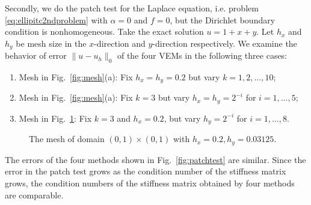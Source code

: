 \documentclass[10pt]{amsart}
\numberwithin{equation}{section}
\begin{document}
Secondly, we do the patch test for the Laplace equation, i.e. problem \eqref{eq:ellipitc2ndproblem} with $\alpha = 0$ and $f=0$, but the Dirichlet boundary condition is nonhomogeneous. Take the exact solution $u=1+x+y$. %
Let $h_x$ and $h_y$ be mesh size in the $x$-direction and
$y$-direction respectively.
We examine the behavior of error $\|u - u_h\|_0$ of the four VEMs in the
following three cases:
\begin{enumerate}[(1)]
\item Mesh in Fig.~\ref{fig:mesh}(a): Fix $h_x=h_y=0.2$ but vary $k= 1, 2, \ldots, 10$;
\item Mesh in Fig.~\ref{fig:mesh}(a): Fix $k=3$ but vary $h_x=h_y=2^{-i}$ for $i=1,\ldots, 5$;
\item Mesh in Fig.~\ref{fig:polymesh}: Fix $k=3$ and $h_x=0.2$, but vary $h_y=2^{-i}$ for $i=1,\ldots, 8$.
\end{enumerate}
\begin{figure}[htbp]
\centering
\caption{The mesh of domain $(0, 1)\times(0, 1)$ with
$h_x=0.2, h_y = 0.03125$.}
  \label{fig:polymesh} %
\end{figure}
The errors of the four methods shown in Fig.~\ref{fig:patchtest} are similar. 
Since the error in the patch test
grows as the condition number of the stiffness matrix grows, 
the condition numbers of the stiffness matrix obtained by
four methods are comparable.
\end{document}
